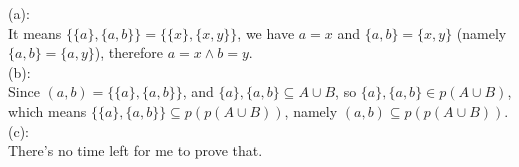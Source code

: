 \documentclass[a4paper, justified]{tufte-handout}
\begin{document}
\beginoptional

\begin{problem}[UD Problem 9.23]
\end{problem}

\begin{solution}
  (a):\\
  It means $ \{\{a\},\{a,b\}\} = \{\{x\},\{x,y\}\} $, we have $a=x$ and $\{a,b\}=\{x,y\}$ (namely $\{a,b\}=\{a,y\}$), therefore $a=x \wedge b=y$. \\
  (b):\\
  Since $ (a,b) = \{\{a\},\{a,b\}\} $, and $\{a\}, \{a,b\} \subseteq A\cup B $, so $\{a\}, \{a,b\} \in p(A\cup B) $, which means $\{\{a\}, \{a,b\}\} \subseteq p(p(A\cup B)) $, namely $(a,b) \subseteq p(p(A\cup B)) $.\\
  (c):\\
  There's no time left for me to prove that.
\end{solution}

\beginot

%
%
%
\end{document}
